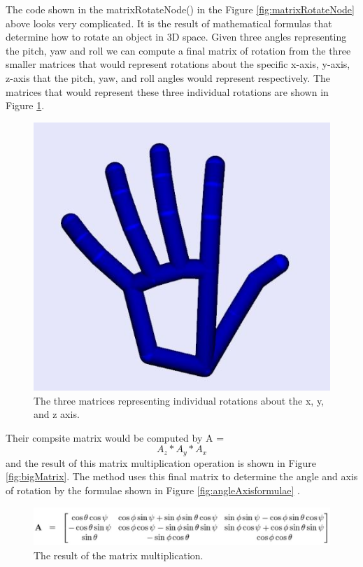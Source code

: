The code shown in the matrixRotateNode() in the Figure \ref{fig:matrixRotateNode} above looks very complicated. It is the result of mathematical formulas that determine how to rotate an object in 3D space. Given three angles representing the pitch, yaw and roll we can compute a final matrix of rotation from the three smaller matrices that would represent rotations about the specific x-axis, y-axis, z-axis that the pitch, yaw, and roll angles would represent respectively. The matrices that would represent these three individual rotations are shown in Figure \ref{fig:threeMatrices}. 
\begin{figure}[H]
\centering
\includegraphics[scale=0.45]{Figures/4_handFinalFix.JPG}
\caption[Single Rotation Matrices]{The three matrices representing individual rotations about the x, y, and z axis.}
\label{fig:threeMatrices}
\end{figure}

Their compsite matrix would be computed by A = \[A_z*A_y*A_x\] and the result of this matrix multiplication operation is shown in Figure \ref{fig:bigMatrix}. The method uses this final matrix to determine the angle and axis of rotation by the formulae shown in Figure \ref{fig:angleAxisformulae} . 
\begin{figure}[H]
\centering
\includegraphics[scale=0.45]{Figures/4_bigMatrix.JPG}
\caption[Composite Rotational Matrix]{The result of the matrix multiplication.}
\label{fig:c}
\end{figure}

